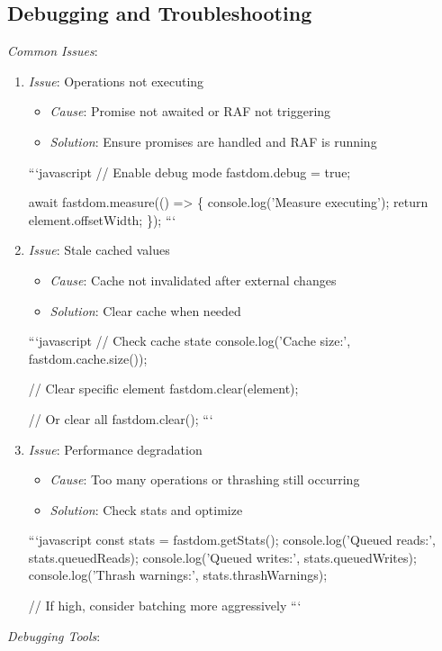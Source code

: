 \documentclass[11pt]{article}
\begin{document}
\subsection{Debugging and Troubleshooting}
\label{sec:org58f5090}

\emph{Common Issues}:

\begin{enumerate}
\item \emph{Issue}: Operations not executing
\begin{itemize}
\item \emph{Cause}: Promise not awaited or RAF not triggering
\item \emph{Solution}: Ensure promises are handled and RAF is running
\end{itemize}
```javascript
// Enable debug mode
fastdom.debug = true;

await fastdom.measure(() => \{
  console.log('Measure executing');
  return element.offsetWidth;
\});
```

\item \emph{Issue}: Stale cached values
\begin{itemize}
\item \emph{Cause}: Cache not invalidated after external changes
\item \emph{Solution}: Clear cache when needed
\end{itemize}
```javascript
// Check cache state
console.log('Cache size:', fastdom.cache.size());

// Clear specific element
fastdom.clear(element);

// Or clear all
fastdom.clear();
```

\item \emph{Issue}: Performance degradation
\begin{itemize}
\item \emph{Cause}: Too many operations or thrashing still occurring
\item \emph{Solution}: Check stats and optimize
\end{itemize}
```javascript
const stats = fastdom.getStats();
console.log('Queued reads:', stats.queuedReads);
console.log('Queued writes:', stats.queuedWrites);
console.log('Thrash warnings:', stats.thrashWarnings);

// If high, consider batching more aggressively
```
\end{enumerate}

\emph{Debugging Tools}:
\end{document}

